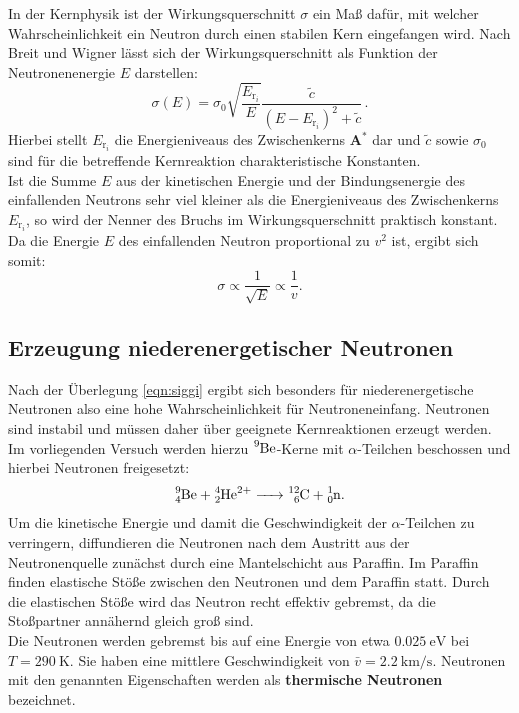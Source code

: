 In der Kernphysik ist der Wirkungsquerschnitt $\sigma$ ein Maß dafür, mit welcher Wahrscheinlichkeit ein Neutron durch einen stabilen Kern eingefangen wird.
Nach Breit und Wigner lässt sich der Wirkungsquerschnitt als Funktion der Neutronenenergie $E$ darstellen:
\begin{equation}
  \sigma (E)=\sigma _0 \sqrt{\frac{E_{\mathrm{r}_i}}{E}}\frac{\tilde{c}}{\left(E-E_{\mathrm{r}_i}\right)^2 +\tilde{c}} \, \text{.}
\end{equation}
Hierbei stellt $E_{\mathrm{r}_i}$ die Energieniveaus des Zwischenkerns $\mathrm{\textbf{A}}^{*}$ dar und $\tilde{c}$ sowie $\sigma_0$ sind für die betreffende Kernreaktion charakteristische Konstanten.\\
Ist die Summe $E$ aus der kinetischen Energie und der Bindungsenergie des einfallenden Neutrons sehr viel kleiner als die Energieniveaus des Zwischenkerns $E_{\mathrm{r}_i}$, so wird der Nenner des Bruchs im Wirkungsquerschnitt praktisch konstant. Da die Energie $E$ des einfallenden Neutron proportional zu $v^2$ ist, ergibt sich somit:
\begin{equation}
  \label{eqn:siggi}
  \sigma \propto \frac{1}{\sqrt{E}}\propto \frac{1}{v} \text{.}
\end{equation}

\subsection{Erzeugung niederenergetischer Neutronen}
Nach der Überlegung \ref{eqn:siggi} ergibt sich besonders für niederenergetische Neutronen also eine hohe Wahrscheinlichkeit für Neutroneneinfang.
Neutronen sind instabil und müssen daher über geeignete Kernreaktionen erzeugt werden.
Im vorliegenden Versuch werden hierzu $\ce{^{9}Be}$-Kerne mit $\alpha$-Teilchen beschossen und hierbei Neutronen freigesetzt:
\begin{align}
    \ce{ ^{9}_4Be + ^{4}_2He^{2+}  -> ^{12}_6C + ^{1}_0n}\text{.}
\end{align}
Um die kinetische Energie und damit die Geschwindigkeit der $\alpha$-Teilchen zu verringern, diffundieren die Neutronen nach dem Austritt aus der Neutronenquelle zunächst durch eine Mantelschicht aus Paraffin. Im Paraffin finden elastische Stöße zwischen den Neutronen und dem Paraffin statt. Durch die elastischen Stöße wird das Neutron recht effektiv gebremst, da die Stoßpartner annähernd gleich groß sind.\\
Die Neutronen werden gebremst bis auf eine Energie von etwa $\SI{0.025}{\electronvolt}$ bei $T=\SI{290}{\kelvin}$. Sie haben eine mittlere Geschwindigkeit von $\bar{v}=\SI{2.2}{\kilo\meter\per\second}$. Neutronen mit den genannten Eigenschaften werden als \textbf{thermische Neutronen} bezeichnet.

